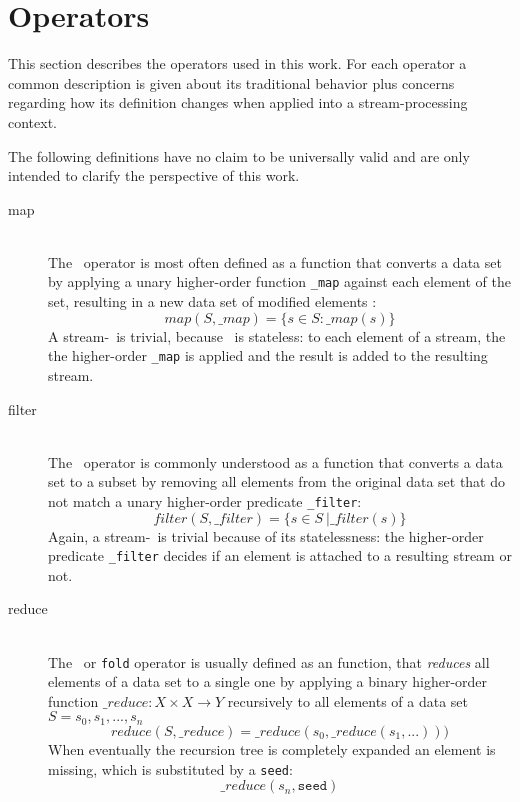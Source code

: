\section{Operators}
\label{sect:operators}

This section describes the operators used in this work.
For each operator a common description is given about its traditional behavior plus concerns regarding how its definition changes when applied into a stream-processing context.

The following definitions have no claim to be universally valid and are only intended to clarify the perspective of this work.

\begin{description}
  \item[map] \hfill \\
  The \map\ operator is most often defined as a function that converts a data set by applying a unary higher-order function \texttt{\_map} against each element of the set, resulting in a new data set of modified elements \cite{Wiki:Map}:
	$$map\left(S, \_map\right)=\{s\in S : \_map(s)\}$$
	A stream-\map\ is trivial, because \map\ is stateless: to each element of a stream, the the higher-order \texttt{\_map} is applied and the result is added to the resulting stream.
  \item[filter] \hfill \\
  The \filter\ operator is commonly understood as a function that converts a data set to a subset by removing all elements from the original data set that do not match a unary higher-order predicate \texttt{\_filter}\cite{Wiki:Filter}:
	$$filter\left(S, \_filter\right)=\{s\in S\ | \_filter\left(s\right)\}$$
	Again, a stream-\filter\ is trivial because of its statelessness: the higher-order predicate \texttt{\_filter} decides if an element is attached to a resulting stream or not.
  \item[reduce] \hfill \\
  The \reduce\ or \texttt{fold} operator is usually\cite{Wiki:Fold} defined as an function, that \textsl{reduces} all elements of a data set to a single one by applying a binary higher-order function
	$\_reduce: X \times X \rightarrow Y $
	recursively to all elements of a data set
	$S={s_0, s_1, ..., s_n}$
	$$ reduce(S, \_reduce)=\_reduce(s_0, \_reduce(s_1, ...))) $$
	When eventually the recursion tree is completely expanded an element is missing, which is substituted by a \texttt{seed}:
	$$ \_reduce(s_n, \texttt{seed}) $$
	

\end{description}
